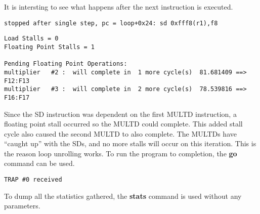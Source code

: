 It is intersting to see what happens after the next instruction is executed. \\

\begin{verbatim}
stopped after single step, pc = loop+0x24: sd 0xfff8(r1),f8
\end{verbatim}

\begin{verbatim}
Load Stalls = 0
Floating Point Stalls = 1

Pending Floating Point Operations:
multiplier   #2 :  will complete in  1 more cycle(s)  81.681409 ==> F12:F13
multiplier   #3 :  will complete in  2 more cycle(s)  78.539816 ==> F16:F17
\end{verbatim}

Since the SD instruction was dependent on the first MULTD instruction, a
floating point stall occurred so the MULTD could complete.  This added stall
cycle also caused the second MULTD to also complete.  The MULTDs have
``caught up'' with the SDs, and no more stalls will occur on this 
iteration.  This is the reason loop unrolling works.  To run the program
to completion, the {\bf go} command can be used. \\

\begin{verbatim}
TRAP #0 received
\end{verbatim}

To dump all the statistics gathered, the {\bf stats} command is used without
any parameters.

